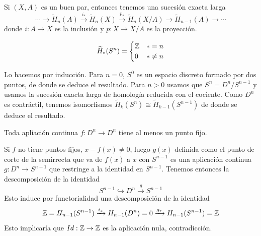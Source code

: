 \documentclass[TA.tex]{subfiles}
\begin{document}
\begin{teorema}
Si $(X,A)$ es un buen par, entonces tenemos una sucesión exacta larga
\[
\cdots\to \widetilde{H}_n(A)\xrightarrow{i_*}\widetilde{H}_n(X)\xrightarrow{p_*}\widetilde{H}_n(X/A)\to\widetilde{H}_{n-1}(A)\to\cdots
\]
donde $i:A\to X$ es la inclusión y $p:X\to X/A$ es la proyección.
\end{teorema}

\begin{ej}
$$\widetilde{H}_*(S^n)=\begin{cases}
\mathbb{Z} & *=n\\
0 & *\neq n
\end{cases}$$

Lo hacemos por inducción. Para $n=0$, $S^0$ es un espacio discreto formado por dos puntos, de donde se deduce el resultado. Para $n>0$ usamos que $S^n=D^n/S^{n-1}$ y usamos la sucesión exacta larga de homología reducida con el cociente. Como $D^n$ es contráctil, tenemos isomorfismos $\widetilde{H}_k(S^n)\cong\widetilde{H}_{k-1}(S^{n-1})$ de donde se deduce el resultado. 
\end{ej}

\begin{teorema}
Toda apliación continua $f:D^n\to D^n$ tiene al menos un punto fijo.
\end{teorema}
\begin{dem}
Si $f$ no tiene puntos fijos, $x-f(x)\neq 0$, luego $g(x)$ definida como el punto de corte de la semirrecta que va de $f(x)$ a $x$ con $S^{n-1}$  es una aplicación continua $g:D^n\to S^{n-1}$ que restringe a la identidad en $S^{n-1}$. Tenemos entonces la descomposición de la identidad
\[
S^{n-1}\hookrightarrow D^n\xrightarrow{g}S^{n-1}
\] 
Esto induce por functorialidad una descomposición de la identidad
\[
\mathbb{Z}=H_{n-1}(S^{n-1})\xrightarrow{i_*}H_{n-1}(D^n)=0\xrightarrow{g_*}H_{n-1}(S^{n-1})=\mathbb{Z}
\]
Esto implicaría que $Id:\mathbb{Z}\to\mathbb{Z}$ es la aplicación nula, contradicción.

\end{dem}
\end{document}
